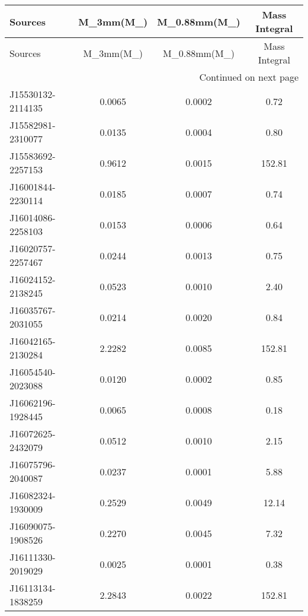 \begin{longtable}{lccc}
\toprule
          Sources &  M_{3mm}(M_{\quad}) &  M_{0.88mm}(M_{\quad}) &  Mass Integral \\
\midrule
\endfirsthead

\toprule
          Sources &  M_{3mm}(M_{\quad}) &  M_{0.88mm}(M_{\quad}) &  Mass Integral \\
\midrule
\endhead
\midrule
\multicolumn{4}{r}{{Continued on next page}} \\
\midrule
\endfoot

\bottomrule
\endlastfoot
J15530132-2114135 &              0.0065 &                 0.0002 &           0.72 \\
J15582981-2310077 &              0.0135 &                 0.0004 &           0.80 \\
J15583692-2257153 &              0.9612 &                 0.0015 &         152.81 \\
J16001844-2230114 &              0.0185 &                 0.0007 &           0.74 \\
J16014086-2258103 &              0.0153 &                 0.0006 &           0.64 \\
J16020757-2257467 &              0.0244 &                 0.0013 &           0.75 \\
J16024152-2138245 &              0.0523 &                 0.0010 &           2.40 \\
J16035767-2031055 &              0.0214 &                 0.0020 &           0.84 \\
J16042165-2130284 &              2.2282 &                 0.0085 &         152.81 \\
J16054540-2023088 &              0.0120 &                 0.0002 &           0.85 \\
J16062196-1928445 &              0.0065 &                 0.0008 &           0.18 \\
J16072625-2432079 &              0.0512 &                 0.0010 &           2.15 \\
J16075796-2040087 &              0.0237 &                 0.0001 &           5.88 \\
J16082324-1930009 &              0.2529 &                 0.0049 &          12.14 \\
J16090075-1908526 &              0.2270 &                 0.0045 &           7.32 \\
J16111330-2019029 &              0.0025 &                 0.0001 &           0.38 \\
J16113134-1838259 &              2.2843 &                 0.0022 &         152.81 \\

\end{longtable}

